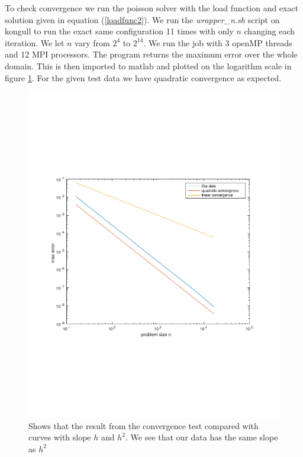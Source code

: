 To check convergence we run the poisson solver with the load function and exact solution given in equation (\ref{loadfunc2}). We run the \textit{wrapper\_n.sh} script on kongull to run the exact same configuration 11 times with only $n$ changing each iteration. We let $n$ vary from $2^4$ to $2^{14}$. We run the job with 3 openMP threads and 12 MPI processors. The program returns the maximum error over the whole domain. This is then imported to matlab and plotted on the logarithm scale in figure \ref{fig:checkConv}. For the given test data we have quadratic convergence as expected.


\begin{figure}[h]
\centering
\includegraphics[width=0.6\linewidth]{./figures/checkConv}
\caption{Shows that the result from the convergence test compared with curves with slope $h$ and $h^2$. We see that our data has the same slope as $h^2$}
\label{fig:checkConv}
\end{figure}
